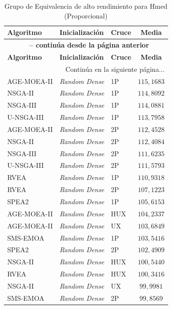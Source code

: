 \begin{longtable}{lllc}
    \caption{Grupo de Equivalencia de alto rendimiento para Hmed (Proporcional)}
    \label{tab:elite_avghd_prop} \\
    \toprule
    \textbf{Algoritmo} & \textbf{Inicialización} & \textbf{Cruce} & \textbf{Media} \\
    \midrule
    \endfirsthead
    \multicolumn{4}{c}{{\bfseries \tablename\ \thetable{} -- continúa desde la página anterior}} \\
    \toprule
    \textbf{Algoritmo} & \textbf{Inicialización} & \textbf{Cruce} & \textbf{Media} \\
    \midrule
    \endhead
    \midrule \multicolumn{4}{r}{{Continúa en la siguiente página...}} \\
    \endfoot
    \bottomrule
    \endlastfoot
    AGE-MOEA-II & \textit{Random Dense} & 1P & $115{,}1683$ \\
NSGA-II & \textit{Random Dense} & 1P & $114{,}8092$ \\
NSGA-III & \textit{Random Dense} & 1P & $114{,}0881$ \\
U-NSGA-III & \textit{Random Dense} & 1P & $113{,}7958$ \\
AGE-MOEA-II & \textit{Random Dense} & 2P & $112{,}4528$ \\
NSGA-II & \textit{Random Dense} & 2P & $112{,}4084$ \\
NSGA-III & \textit{Random Dense} & 2P & $111{,}6235$ \\
U-NSGA-III & \textit{Random Dense} & 2P & $111{,}5793$ \\
RVEA & \textit{Random Dense} & 1P & $110{,}9318$ \\
RVEA & \textit{Random Dense} & 2P & $107{,}1223$ \\
SPEA2 & \textit{Random Dense} & 1P & $105{,}6153$ \\
AGE-MOEA-II & \textit{Random Dense} & HUX & $104{,}2337$ \\
AGE-MOEA-II & \textit{Random Dense} & UX & $103{,}6849$ \\
SMS-EMOA & \textit{Random Dense} & 1P & $103{,}5416$ \\
SPEA2 & \textit{Random Dense} & 2P & $102{,}4909$ \\
NSGA-II & \textit{Random Dense} & HUX & $100{,}5440$ \\
RVEA & \textit{Random Dense} & HUX & $100{,}3416$ \\
NSGA-II & \textit{Random Dense} & UX & $99{,}9981$ \\
SMS-EMOA & \textit{Random Dense} & 2P & $99{,}8569$ \\

\end{longtable}
